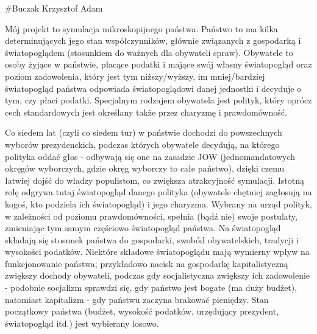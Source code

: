 \#\+Buczak Krzysztof Adam

Mój projekt to symulacja mikroskopijnego państwa. Państwo to ma kilka determinujących jego stan współczynników, głównie związanych z gospodarką i światopoglądem (stosunkiem do ważnych dla obywateli spraw). Obywatele to osoby żyjące w państwie, płacące podatki i mające swój własny światopogląd oraz poziom zadowolenia, który jest tym niższy/wyższy, im mniej/bardziej światopogląd państwa odpowiada światopoglądowi danej jednostki i decyduje o tym, czy płaci podatki. Specjalnym rodzajem obywatela jest polityk, który oprócz cech standardowych jest określany także przez charyzmę i prawdomówność.

Co siedem lat (czyli co siedem tur) w państwie dochodzi do powszechnych wyborów prezydenckich, podczas których obywatele decydują, na którego polityka oddać głos -\/ odbywają się one na zasadzie J\+O\+W (jednomandatowych okręgów wyborczych, gdzie okręg wyborczy to całe państwo), dzięki czemu łatwiej dojść do władzy populistom, co zwiększa atrakcyjność symulacji. Istotną rolę odgrywa tutaj światopogląd danego polityka (obywatele chętniej zagłosują na kogoś, kto podziela ich światopogląd) i jego charyzma. Wybrany na urząd polityk, w zależności od poziomu prawdomówności, spełnia (bądź nie) swoje postulaty, zmieniając tym samym częściowo światopogląd państwa. Na światopogląd składają się stosunek państwa do gospodarki, swobód obywatelskich, tradycji i wysokości podatków. Niektóre składowe światopoglądu mają wymierny wpływ na funkcjonowanie państwa; przykładowo nacisk na gospodarkę kapitalistyczną zwiększy dochody obywateli, podczas gdy socjalistyczna zwiększy ich zadowolenie -\/ podobnie socjalizm sprawdzi się, gdy państwo jest bogate (ma duży budżet), natomiast kapitalizm -\/ gdy państwu zaczyna brakować pieniędzy. Stan początkowy państwa (budżet, wysokość podatków, urzędujący prezydent, światopogląd itd.) jest wybierany losowo. 